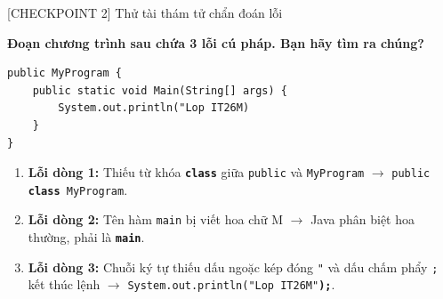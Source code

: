 \documentclass[aspectratio=169, 10pt]{beamer}
\begin{document}
\begin{frame}[fragile]{[CHECKPOINT 2] Thử tài thám tử chẩn đoán lỗi}
  \begin{alertblock}{\textbf{Đoạn chương trình sau chứa 3 lỗi cú pháp. Bạn hãy tìm ra chúng?}}
    \begin{lstlisting}
public MyProgram {
    public static void Main(String[] args) {
        System.out.println("Lop IT26M)
    }
}
    \end{lstlisting}
  \end{alertblock}

  \begin{tcolorbox}[colback=white,colframe=UniGreen,title=\textbf{Chẩn đoán và phân tích chi tiết:}]
    \small
    \begin{enumerate}
      \item \textbf{Lỗi dòng 1:} Thiếu từ khóa \texttt{\textbf{class}} giữa \texttt{public} và \texttt{MyProgram} $\to$ \texttt{public \textbf{class} MyProgram}.
      \item \textbf{Lỗi dòng 2:} Tên hàm \texttt{main} bị viết hoa chữ M $\to$ Java phân biệt hoa thường, phải là \texttt{\textbf{main}}.
      \item \textbf{Lỗi dòng 3:} Chuỗi ký tự thiếu dấu ngoặc kép đóng \texttt{"} và dấu chấm phẩy \texttt{;} kết thúc lệnh $\to$ \texttt{System.out.println("Lop IT26M"\textbf{);}}.
    \end{enumerate}
  \end{tcolorbox}
\end{frame}
\end{document}
